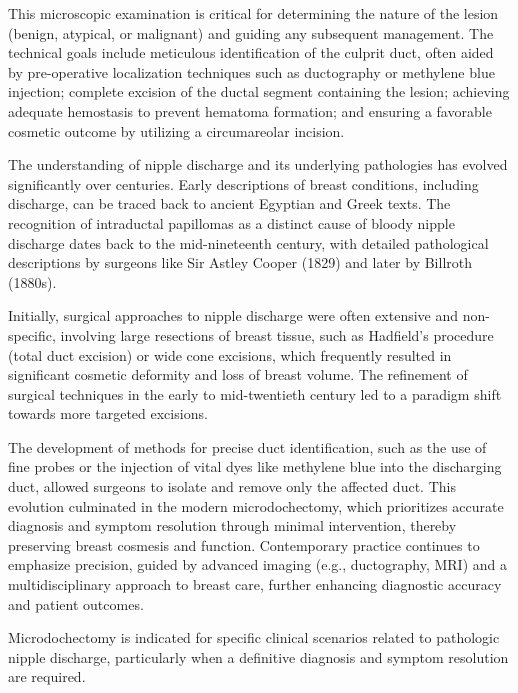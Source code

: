 This microscopic examination is critical for determining the nature of the lesion (benign, atypical, or malignant) and guiding any subsequent management. The technical goals include meticulous identification of the culprit duct, often aided by pre-operative localization techniques such as ductography or methylene blue injection; complete excision of the ductal segment containing the lesion; achieving adequate hemostasis to prevent hematoma formation; and ensuring a favorable cosmetic outcome by utilizing a circumareolar incision.

The understanding of nipple discharge and its underlying pathologies has evolved significantly over centuries. Early descriptions of breast conditions, including discharge, can be traced back to ancient Egyptian and Greek texts. The recognition of intraductal papillomas as a distinct cause of bloody nipple discharge dates back to the mid-nineteenth century, with detailed pathological descriptions by surgeons like Sir Astley Cooper (1829) and later by Billroth (1880s). 

Initially, surgical approaches to nipple discharge were often extensive and non-specific, involving large resections of breast tissue, such as Hadfield's procedure (total duct excision) or wide cone excisions, which frequently resulted in significant cosmetic deformity and loss of breast volume. The refinement of surgical techniques in the early to mid-twentieth century led to a paradigm shift towards more targeted excisions. 

The development of methods for precise duct identification, such as the use of fine probes or the injection of vital dyes like methylene blue into the discharging duct, allowed surgeons to isolate and remove only the affected duct. This evolution culminated in the modern microdochectomy, which prioritizes accurate diagnosis and symptom resolution through minimal intervention, thereby preserving breast cosmesis and function. Contemporary practice continues to emphasize precision, guided by advanced imaging (e.g., ductography, MRI) and a multidisciplinary approach to breast care, further enhancing diagnostic accuracy and patient outcomes.

Microdochectomy is indicated for specific clinical scenarios related to pathologic nipple discharge, particularly when a definitive diagnosis and symptom resolution are required.

